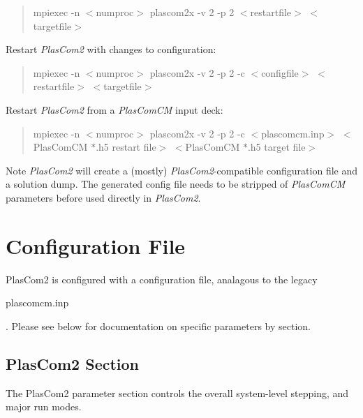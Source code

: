 \begin{quote}
mpiexec -\/n $<$numproc$>$ plascom2x -\/v 2 -\/p 2 $<$restartfile$>$ $<$targetfile$>$~\newline
\end{quote}



\begin{DoxyItemize}
\item Restart {\itshape Plas\+Com2} with changes to configuration\+:
\end{DoxyItemize}

\begin{quote}
mpiexec -\/n $<$numproc$>$ plascom2x -\/v 2 -\/p 2 -\/c $<$configfile$>$ $<$restartfile$>$ $<$targetfile$>$~\newline
\end{quote}



\begin{DoxyItemize}
\item Restart {\itshape Plas\+Com2} from a {\itshape Plas\+Com\+CM} input deck\+:
\end{DoxyItemize}

\begin{quote}
mpiexec -\/n $<$numproc$>$ plascom2x -\/v 2 -\/p 2 -\/c $<$plascomcm.\+inp$>$ $<$Plas\+Com\+CM $\ast$.h5 restart file$>$ $<$Plas\+Com\+CM $\ast$.h5 target file$>$~\newline
\end{quote}


\begin{DoxyNote}{Note}
{\itshape Plas\+Com2} will create a (mostly) {\itshape Plas\+Com2}-\/compatible configuration file and a solution dump. The generated config file needs to be stripped of {\itshape Plas\+Com\+CM} parameters before used directly in {\itshape Plas\+Com2}.
\end{DoxyNote}
\hypertarget{user_reference_configurationfile}{}\section{Configuration File}\label{user_reference_configurationfile}
Plas\+Com2 is configured with a configuration file, analagous to the legacy 
\begin{DoxyPre}plascomcm.inp\end{DoxyPre}
. Please see below for documentation on specific parameters by section.\hypertarget{user_reference_configplascom2}{}\subsection{Plas\+Com2 Section}\label{user_reference_configplascom2}
The Plas\+Com2 parameter section controls the overall system-\/level stepping, and major run modes.


